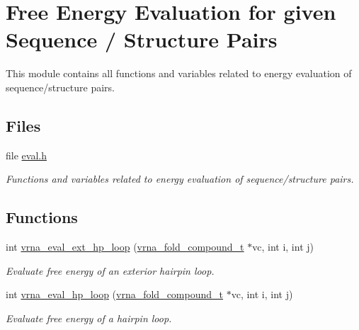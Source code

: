 \hypertarget{group__eval}{}\section{Free Energy Evaluation for given Sequence / Structure Pairs}
\label{group__eval}


This module contains all functions and variables related to energy evaluation of sequence/structure pairs.  


\subsection*{Files}
\begin{DoxyCompactItemize}
\item 
file \hyperlink{eval_8h}{eval.\+h}
\begin{DoxyCompactList}\small\item\em Functions and variables related to energy evaluation of sequence/structure pairs. \end{DoxyCompactList}\end{DoxyCompactItemize}
\subsection*{Functions}
\begin{DoxyCompactItemize}
\item 
int \hyperlink{group__eval_gad3b92453a6b501856eec8fae39f3235d}{vrna\+\_\+eval\+\_\+ext\+\_\+hp\+\_\+loop} (\hyperlink{group__fold__compound_ga1b0cef17fd40466cef5968eaeeff6166}{vrna\+\_\+fold\+\_\+compound\+\_\+t} $\ast$vc, int i, int j)\hypertarget{group__eval_gad3b92453a6b501856eec8fae39f3235d}{}\label{group__eval_gad3b92453a6b501856eec8fae39f3235d}

\begin{DoxyCompactList}\small\item\em Evaluate free energy of an exterior hairpin loop. \end{DoxyCompactList}\item 
int \hyperlink{group__eval_gab3eb4651dc26dc2b653a57dd340d7e68}{vrna\+\_\+eval\+\_\+hp\+\_\+loop} (\hyperlink{group__fold__compound_ga1b0cef17fd40466cef5968eaeeff6166}{vrna\+\_\+fold\+\_\+compound\+\_\+t} $\ast$vc, int i, int j)
\begin{DoxyCompactList}\small\item\em Evaluate free energy of a hairpin loop. \end{DoxyCompactList}\end{DoxyCompactItemize}


